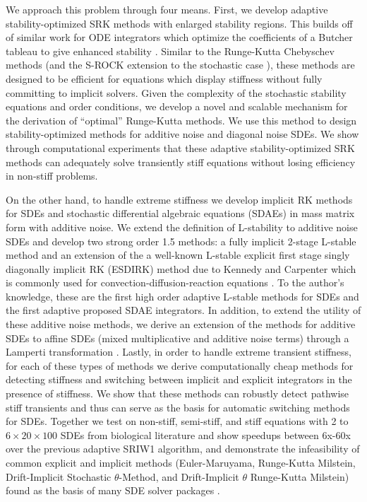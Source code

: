\documentclass{article}
\begin{document}
We approach this problem through four means. First, we develop adaptive
stability-optimized SRK methods with enlarged stability regions. This
builds off of similar work for ODE integrators which optimize the
coefficients of a Butcher tableau to give enhanced stability \cite{RN3514,RN3515,RN3517}.
Similar to the Runge-Kutta Chebyschev methods \cite{RN3790} (and
the S-ROCK extension to the stochastic case \cite{RN3799,RN3800,RN3801}),
these methods are designed to be efficient for equations which display
stiffness without fully committing to implicit solvers. Given the
complexity of the stochastic stability equations and order conditions,
we develop a novel and scalable mechanism for the derivation of ``optimal''
Runge-Kutta methods. We use this method to design stability-optimized
methods for additive noise and diagonal noise SDEs. We show through
computational experiments that these adaptive stability-optimized
SRK methods can adequately solve transiently stiff equations without
losing efficiency in non-stiff problems.

On the other hand, to handle extreme stiffness we develop implicit
RK methods for SDEs and stochastic differential algebraic equations
(SDAEs) in mass matrix form with additive noise. We extend the definition
of L-stability to additive noise SDEs and develop two strong order
1.5 methods: a fully implicit 2-stage L-stable method and an extension
of the a well-known L-stable explicit first stage singly diagonally
implicit RK (ESDIRK) method due to Kennedy and Carpenter which is
commonly used for convection-diffusion-reaction equations \cite{RN3792}.
To the author's knowledge, these are the first high order adaptive
L-stable methods for SDEs and the first adaptive proposed SDAE integrators.
In addition, to extend the utility of these additive noise methods,
we derive an extension of the methods for additive SDEs to affine
SDEs (mixed multiplicative and additive noise terms) through a Lamperti
transformation \cite{RN3525}. Lastly, in order to handle extreme
transient stiffness, for each of these types of methods we derive
computationally cheap methods for detecting stiffness and switching
between implicit and explicit integrators in the presence of stiffness.
We show that these methods can robustly detect pathwise stiff transients
and thus can serve as the basis for automatic switching methods for
SDEs. Together we test on non-stiff, semi-stiff, and stiff equations
with 2 to $6\times20\times100$ SDEs from biological literature and
show speedups between 6x-60x over the previous adaptive SRIW1 algorithm,
and demonstrate the infeasibility of common explicit and implicit
methods (Euler-Maruyama, Runge-Kutta Milstein, Drift-Implicit Stochastic
$\theta$-Method, and Drift-Implicit $\theta$ Runge-Kutta Milstein)
found as the basis of many SDE solver packages \cite{RN3803,RN3802,RN3804}.
\end{document}
